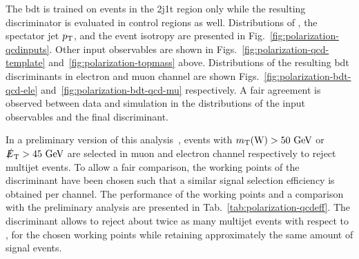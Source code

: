 The \gls{bdt} is trained on events in the 2j1t region only while the resulting discriminator is evaluated in control regions as well. Distributions of \mtw, the spectator jet $p_\textrm{T}$, and the event isotropy are presented in Fig.~\ref{fig:polarization-qcdinputs}. Other input observables are shown in Figs.~\ref{fig:polarization-qcd-template} and~\ref{fig:polarization-topmass} above. Distributions of the resulting \gls{bdt} discriminants in electron and muon channel are shown Figs.~\ref{fig:polarization-bdt-qcd-ele} and~\ref{fig:polarization-bdt-qcd-mu} respectively. A fair agreement is observed between data and simulation in the distributions of the input observables and the final discriminant.


In a preliminary version of this analysis~\cite{CMS-PAS-TOP-13-001}, events with $m_{\textrm{T}}(\textrm{W})>50~\textrm{GeV}$ or $\slashed{E}_{\textrm{T}}>45~\textrm{GeV}$ are selected in muon and electron channel respectively to reject multijet events. To allow a fair comparison, the working points of the \bdtqcd discriminant have been chosen such that a similar signal selection efficiency is obtained per channel. The performance of the working points and a comparison with the preliminary analysis are presented in Tab.~\ref{tab:polarization-qcdeff}. The \bdtqcd discriminant allows to reject about twice as many multijet events with respect to \mtw, \met for the chosen working points while retaining approximately the same amount of signal events.

